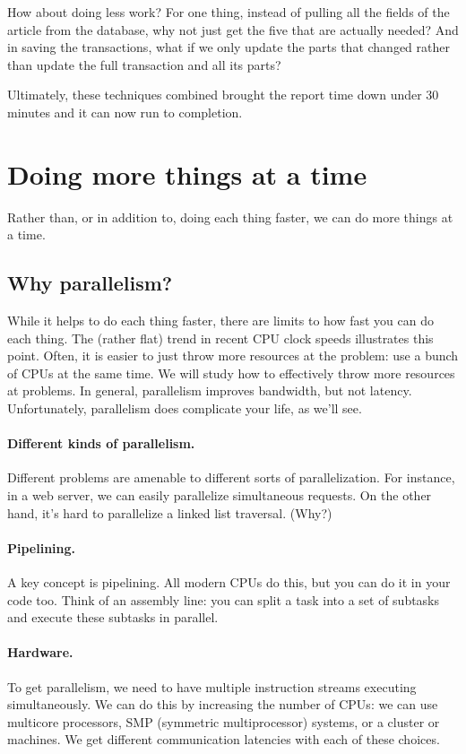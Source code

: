 How about doing less work? For one thing, instead of pulling all the fields of the article from the database, why not just get the five that are actually needed? And in saving the transactions, what if we only update the parts that changed rather than update the full transaction and all its parts?

Ultimately, these techniques combined brought the report time down under 30 minutes and it can now run to completion. 

\section*{Doing more things at a time} 
Rather than, or in addition to, doing each thing faster, we can do
more things at a time.

\subsection*{Why parallelism?}
While it helps to do each thing faster, there are limits to how fast
you can do each thing. The (rather flat) trend in recent CPU clock
speeds illustrates this point.  Often, it is easier to just throw more
resources at the problem: use a bunch of CPUs at the same time. We
will study how to effectively throw more resources at problems.
In general, parallelism improves bandwidth, but not latency.
Unfortunately, parallelism does complicate your life, as we'll see.

\paragraph{Different kinds of parallelism.} Different problems are amenable
to different sorts of parallelization. For instance, in a web server, we
can easily parallelize simultaneous requests. On the other hand, it's hard
to parallelize a linked list traversal. (Why?)

\paragraph{Pipelining.} A key concept is pipelining. All modern CPUs do this,
but you can do it in your code too. Think of an assembly line: you can split
a task into a set of subtasks and execute these subtasks in parallel.

\paragraph{Hardware.} To get parallelism, we need to have multiple instruction
streams executing simultaneously. We can do this by increasing the
number of CPUs: we can use multicore processors, SMP (symmetric
multiprocessor) systems, or a cluster or machines. We get different
communication latencies with each of these choices.


